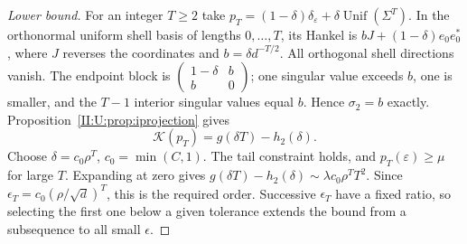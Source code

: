 \begin{proof}[Lower bound]
For an integer $T\ge2$ take
$p_T=(1-\delta)\delta_\varepsilon+\delta\operatorname{Unif}(\Sigma^T)$.
In the orthonormal uniform shell basis of lengths $0,\ldots,T$, its
Hankel is $bJ+(1-\delta)e_0e_0^*$, where $J$ reverses the coordinates
and $b=\delta d^{-T/2}$. All orthogonal shell directions vanish.
The endpoint block is
$\left(\begin{smallmatrix}1-\delta&b\\b&0\end{smallmatrix}\right)$;
one singular value exceeds $b$, one is smaller, and the $T-1$ interior
singular values equal $b$. Hence $\sigma_2=b$ exactly.
Proposition~\ref{II:U:prop:iprojection} gives
\[
 \mathcal K(p_T)=g(\delta T)-h_2(\delta).
\]
Choose $\delta=c_0\rho^T$, $c_0=\min(C,1)$. The tail constraint holds,
and $p_T(\varepsilon)\ge\mu$ for large $T$.
Expanding at zero gives
$g(\delta T)-h_2(\delta)\sim\lambda c_0\rho^TT^2$.
Since $\epsilon_T=c_0(\rho/\sqrt d)^T$, this is the required order.
Successive $\epsilon_T$ have a fixed ratio, so selecting the first one
below a given tolerance extends the bound from a subsequence to all small
$\epsilon$.
\end{proof}
